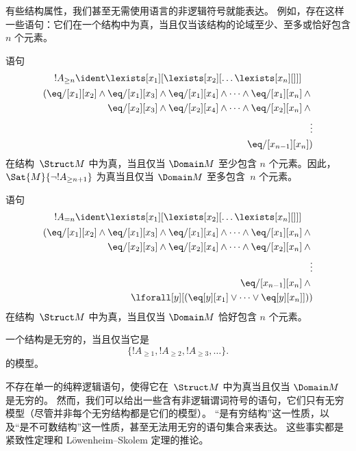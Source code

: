 \documentclass[../../../include/open-logic-section]{subfiles}
\begin{document}



\begin{explain}
有些结构属性，我们甚至无需使用语言的非逻辑符号就能表达。
例如，存在这样一些语句：它们在一个结构中为真，当且仅当该结构的论域至少、至多或恰好包含 $n$ 个元素。
\end{explain}

\begin{prop}
语句
\begin{multline*}
  !A_{\ge n} \ident \lexists[x_1][\lexists[x_2][\dots\lexists[x_n][{}]]]\\
  \begin{aligned}
  (\eq/[x_1][x_2] \land {}
  \eq/[x_1][x_3] \land \eq/[x_1][x_4] \land \dots \land \eq/[x_1][x_n] \land {}\\
\eq/[x_2][x_3] \land \eq/[x_2][x_4] \land \dots \land {} \eq/[x_2][x_n] \land {} \\
\vdots\\
\eq/[x_{n-1}][x_n])
\end{aligned}
\end{multline*}
在结构~$\Struct M$ 中为真，当且仅当 $\Domain M$ 至少包含 $n$ 个元素。因此，$\Sat{M}{\lnot !A_{\ge n+1}}$ 为真当且仅当 $\Domain M$ 至多包含~$n$ 个元素。
\end{prop}

\begin{prop}
语句
\begin{multline*}
!A_{= n} \ident \lexists[x_1][\lexists[x_2][\dots\lexists[x_n][{}]]] \\
\begin{aligned}
  (\eq/[x_1][x_2] \land {}
  \eq/[x_1][x_3] \land \eq/[x_1][x_4] \land \dots \land \eq/[x_1][x_n] \land {}\\
\eq/[x_2][x_3] \land \eq/[x_2][x_4] \land \dots \land {} \eq/[x_2][x_n] \land {} \\
\vdots\\
\eq/[x_{n-1}][x_n] \land {} \\
\lforall[y][(\eq[y][x_1] \lor \dots \lor \eq[y][x_n]]))
\end{aligned}
\end{multline*}
在结构~$\Struct M$ 中为真，当且仅当 $\Domain M$ 恰好包含 $n$ 个元素。
\end{prop}

\begin{prop}
一个结构是无穷的，当且仅当它是
\[
\{!A_{\ge 1}, !A_{\ge 2}, !A_{\ge 3}, \dots \}.
\]
的模型。
\end{prop}

不存在单一的纯粹逻辑语句，使得它在~$\Struct M$ 中为真当且仅当 $\Domain M$ 是无穷的。
然而，我们可以给出一些含有非逻辑谓词符号的语句，它们只有无穷模型（尽管并非每个无穷结构都是它们的模型）。
“是有穷结构”这一性质，以及“是不可数结构”这一性质，甚至无法用无穷的语句集合来表达。
这些事实都是紧致性定理和 Löwenheim--Skolem 定理的推论。
\end{document}

